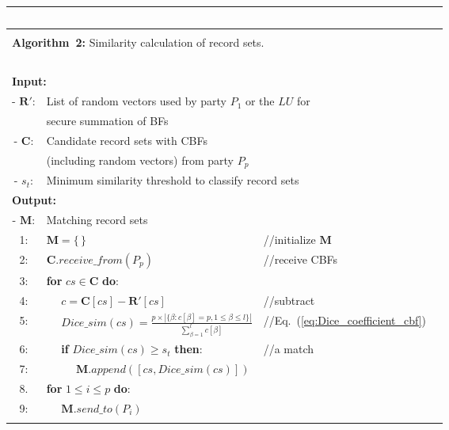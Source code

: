 \documentclass{sig-alternate}
\begin{document}
\begin{itemize}
\begin{table}[!t]
\scriptsize\addtolength{\tabcolsep}{-3pt}
\begin{tabular*}{0.45\textwidth}{c @{\extracolsep{\fill}} lll}
  \label{algo_classify}
    ~ \\[2mm] \hline 
    \\[-2mm]
    \multicolumn{3}{l}{\textbf{Algorithm~2:} Similarity calculation of record sets.} %
      \\[0.5mm] \hline
    ~ \\[-3mm]
    \multicolumn{3}{l}{\textbf{Input:}} \\
      {- $\mathbf{R'}$:} & \multicolumn{2}{l}{ List of random vectors used by party $P_1$ or the $LU$ for} \\
      ~ & \multicolumn{2}{l}{ secure summation of BFs} \\
    {- $\mathbf{C}$:} & 
      \multicolumn{2}{l}{ Candidate record sets with CBFs} \\
     ~ & \multicolumn{2}{l}{ (including random vectors) from party $P_{p}$} \\
    {- $s_t$:} & \multicolumn{2}{l}{ Minimum similarity threshold to classify record sets} \\
    \multicolumn{3}{l}{\textbf{Output:}} \\
    {- $\mathbf{M}$:} & \multicolumn{2}{l}{ Matching record sets} \\[1mm]
    1:&$\mathbf{M} = \{\,\}$&//initialize $\mathbf{M}$\\ 
    2:&$\mathbf{C}.receive\_from(P_p)$&//receive CBFs\\
    3:&\textbf{for} $cs \in \mathbf{C}$ \textbf{do}: & ~ \\
    4:&~~ $c = \mathbf{C}[cs] - \mathbf{R'}[cs]$&//subtract\\ %
    5:&~~ $Dice\_sim(cs) = \frac{p \times |\{\beta: c[\beta] = p, 1 \le \beta \le l\}|}{\sum_{\beta=1}^{l} c[\beta]}$&//Eq.~(\ref{eq:Dice_coefficient_cbf})\\ 
    6:&~~ \textbf{if} $Dice\_sim(cs) \ge s_t$ \textbf{then}:&//a match \\  %
    7:&~~ ~~ $\mathbf{M}.append([cs,Dice\_sim(cs)])$ & ~ \\
    8.&\textbf{for} $1 \le i \le p$ \textbf{do}: & ~ \\
    9:&~~ $\mathbf{M}.send\_to(P_i)$&~\\ [1mm] %
      \hline \\ [2mm]
  \end{tabular*}
\end{table}


\end{itemize}
\end{document}

